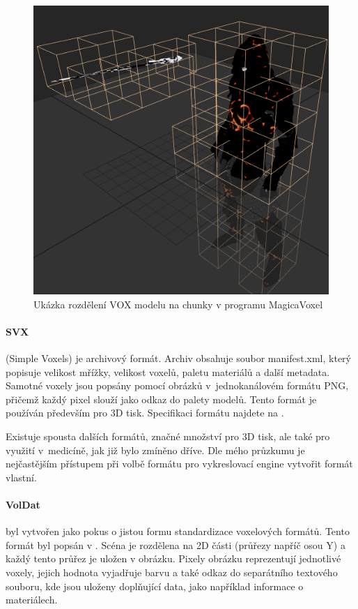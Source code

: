 \begin{figure}[H]
	\centering
	\includegraphics[scale=0.5]{images/magica_voxel_vox.png}
	\caption{Ukázka rozdělení VOX modelu na chunky v programu MagicaVoxel}
	\label{fig:magica_vox}
\end{figure}

\paragraph{SVX} (Simple Voxels) je archivový formát. Archiv obsahuje soubor manifest.xml, který popisuje velikost mřížky, velikost voxelů, paletu materiálů a další metadata. Samotné voxely jsou popsány pomocí obrázků v~jednokanálovém formátu PNG, přičemž každý pixel slouží jako odkaz do palety modelů. Tento formát je používán především pro 3D tisk. Specifikaci formátu najdete na \cite{svx_format_2014}.

Existuje spousta dalších formátů, značné množství pro 3D tisk, ale také pro využití v~medicíně, jak již bylo zmíněno dříve. Dle mého průzkumu je nejčastějším přístupem při volbě formátu pro vykreslovací engine vytvořit formát vlastní.

\paragraph{VolDat} byl vytvořen jako pokus o jistou formu standardizace voxelových formátů. Tento formát byl popsán v \cite{williams_2013}. Scéna je rozdělena na 2D části (průřezy napříč osou Y) a každý tento průřez je uložen v obrázku. Pixely obrázku reprezentují jednotlivé voxely, jejich hodnota vyjadřuje barvu a také odkaz do separátního textového souboru, kde jsou uloženy doplňující data, jako například informace o materiálech. 


